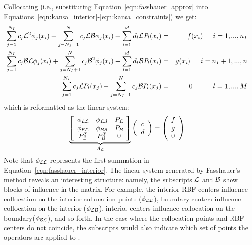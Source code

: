 \documentclass{report}
\begin{document}
{Collocating (i.e., substituting Equation~\ref{eqn:fasshauer_approx} into Equations~\ref{eqn:kansa_interior}-\ref{eqn:kansa_constraints}) we get: 
\begin{eqnarray}
\sum_{j=1}^{N_I}c_j\mathcal{L}^2{\phi_j(x_i)} + \sum_{j=N_I+1}^{N}c_j\mathcal{L}\mathcal{B}\phi_j(x_i) + \sum_{l=1}^{M}d_l \mathcal{L}P_l(x_i) &=&f(x_i)  \hskip1.5em i = 1,...,n_I  \label{eqn:fasshauer_interior} \\ 
\sum_{j=1}^{N_I}c_j\mathcal{B}\mathcal{L}\phi_j(x_i) + \sum_{j=N_I+1}^{N}c_j\mathcal{B}^2{\phi_j(x_i)} + \sum_{l=1}^{M}d_l \mathcal{B}P_l(x_i) &=& g(x_i)  \hskip1.5em i = n_I + 1,..., n \label{eqn:fasshauer_boundary} \\
\sum_{j=1}^{N_I} c_j \mathcal{L}P_l(x_j) + \sum_{j=N_I + 1}^{N} c_j \mathcal{B}P_l(x_j) &=& 0 \hskip3.0em l=1,...,M \label{eqn:fasshauer_constraints} 
\end{eqnarray}
which is reformatted as the linear system: 
\begin{eqnarray}
\underbrace{\left[ \begin{array}{c c c} 
	\phi_{\mathcal{L}\mathcal{L}} & \phi_{\mathcal{L}\mathcal{B}} & P_{\mathcal{L}} \\
	\phi_{\mathcal{B}\mathcal{L}} & \phi_{\mathcal{B}\mathcal{B}} & P_{\mathcal{B}} \\
	P^T_{\mathcal{L}} & P^T_{\mathcal{B}} & 0 \\
	\end{array} \right]}_{A_{\mathcal{L}}} \left( \begin{array}{c}
							{c} \\
							{d}
							 \end{array}
						 \right) = \left( \begin{array}{c}
							{f} \\
							{g} \\
							0
							 \end{array}
						 \right) 
	\label{eqn:fasshauer_method}
\end{eqnarray}
Note that $\phi_{\mathcal{L}\mathcal{L}}$ represents the first summation in Equation~\ref{eqn:fasshauer_interior}. The linear system generated by Fasshauer's method reveals an interesting structure: namely, the subscripts $\mathcal{L}$ and $\mathcal{B}$ show blocks of influence in the matrix. For example, the interior RBF centers influence collocation on the interior collocation points ($\phi_{\mathcal{L}\mathcal{L}}$), boundary centers influence collocation on the interior ($\phi_{\mathcal{L}\mathcal{B}}$), interior centers influence collocation on the boundary($\phi_{\mathcal{B}\mathcal{L}}$), and so forth. In the case where the collocation points and RBF centers do not coincide, the subscripts would also indicate which set of points the operators are applied to \cite{Stevens2009b}. 

}
\end{document}
